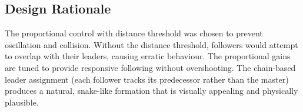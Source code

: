 \subsection{Design Rationale}

The proportional control with distance threshold was chosen to prevent oscillation and collision. Without the distance threshold, followers would attempt to overlap with their leaders, causing erratic behaviour. The proportional gains are tuned to provide responsive following without overshooting. The chain-based leader assignment (each follower tracks its predecessor rather than the master) produces a natural, snake-like formation that is visually appealing and physically plausible.
